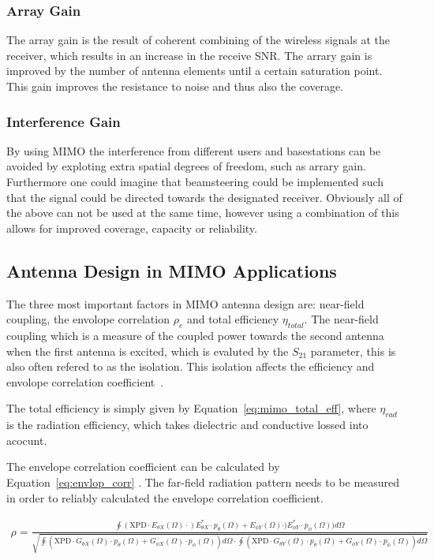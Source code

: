 \subsubsection{Array Gain}
The array gain is the result of coherent combining of the wireless signals at the receiver, which results in an increase in the receive SNR. The arrary gain is improved by the number of antenna elements until a certain saturation point. This gain improves the resistance to noise and thus also the coverage. 
  
\subsubsection{Interference Gain}
By using MIMO the interference from different users and basestations can be avoided by exploting extra spatial degrees of freedom, such as arrary gain. Furthermore one could imagine that beamsteering could be implemented such that the signal could be directed towards the designated receiver. Obviously all of the above can not be used at the same time, however using a combination of this allows for improved coverage, capacity or reliability.
 
\subsection{Antenna Design in MIMO Applications}
The three most important factors in MIMO antenna design are: near-field coupling, the envolope correlation $\rho_e$ and total efficiency $\eta_{total}$. The near-field coupling which is a measure of the coupled power towards the second antenna when the first antenna is excited, which is evaluted by the $S_{21}$ parameter, this is also often refered to as the isolation. This isolation affects the efficiency and envolope correlation coefficient~\cite{Tatomirescu2011PortIsolation}. 

The total efficiency is simply given by Equation~\ref{eq:mimo_total_eff}\cite{Tatomirescu2011PortIsolation}, where $\eta_{rad}$ is the radiation efficiency, which takes dielectric and conductive lossed into acocunt. 

The envelope correlation coefficient can be calculated by Equation~\ref{eq:envlop_corr} \cite{Tatomirescu2011PortIsolation}. The far-field radiation pattern needs to be measured in order to reliably calculated the envelope correlation coefficient.

\begin{align} 
\rho = \frac{\oint(\text{XPD} \cdot E_{\theta X}(\Omega) \cdot) E^*_{\theta X} \cdot p_\theta(\Omega)+E_{\phi Y}(\Omega) \cdot) E^*_{\phi Y} \cdot p_\phi(\Omega) )d\Omega}{\sqrt{\oint(\text{XPD}\cdot G_{\theta X}(\Omega) \cdot p_\theta(\Omega)+G_{\phi X}(\Omega) \cdot p_\phi(\Omega))d\Omega \cdot \oint(\text{XPD}\cdot G_{\theta Y}(\Omega) \cdot p_\theta(\Omega)+G_{\phi Y}(\Omega) \cdot p_\phi(\Omega))d\Omega }}
\end{align}

